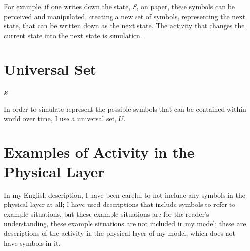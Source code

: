For example, if one writes down the state, $S$, on paper, these
symbols can be perceived and manipulated, creating a new set of
symbols, representing the next state, that can be written down as the
next state.  The activity that changes the current state into the next
state is simulation.

\section{Universal Set}

$\mathcal{S}$

In order to simulate represent the possible symbols that can be
contained within world over time, I use a universal set, $U$.


\section{Examples of Activity in the Physical Layer}

In my English description, I have been careful to not include any
symbols in the physical layer at all; I have used descriptions that
include symbols to refer to example situations, but these example
situations are for the reader's understanding, these example
situations are not included in my model; these are descriptions of the
activity in the physical layer of my model, which does not have
symbols in it.
